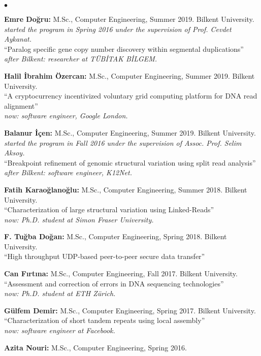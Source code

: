 \documentclass[margin,line]{res}
\newenvironment{list2}{
  \begin{list}{$\bullet$}{%
      \setlength{\itemsep}{0.1cm}
      \setlength{\parsep}{0in} \setlength{\parskip}{0in}
      \setlength{\topsep}{0in} \setlength{\partopsep}{0in} 
      \setlength{\leftmargin}{0.2in}}}{\end{list}}
\begin{document}
\begin{resume}
\begin{list2}
\item
  {\bf Emre Doğru:} M.Sc., Computer Engineering, Summer 2019.
  Bilkent University. {\it started the program in Spring 2016 under the supervision of Prof. Cevdet Aykanat.}\\
  ``Paralog specific gene copy number discovery within segmental duplications''\\
  {\it after Bilkent: researcher at TÜBİTAK BİLGEM.}
\item
  {\bf Halil İbrahim Özercan:} M.Sc., Computer Engineering, Summer 2019.
  Bilkent University. \\
  ``A cryptocurrency incentivized voluntary grid computing platform for DNA read alignment''\\
  {\it now: software engineer, Google London.}
\item
  {\bf Balanur İçen:} M.Sc., Computer Engineering, Summer 2019.
  Bilkent University. {\it started the program in Fall 2016 under the supervision of Assoc. Prof. Selim Aksoy.}\\
  ``Breakpoint refinement of genomic structural variation using split read analysis'' \\
  {\it after Bilkent: software engineer, K12Net.}
\item
  {\bf Fatih Karaoğlanoğlu:} M.Sc., Computer Engineering, Summer 2018.
  Bilkent University. \\
  ``Characterization of large structural variation using Linked-Reads''\\
  {\it now: Ph.D. student at Simon Fraser University.}
\item
  {\bf F. Tuğba Doğan:} M.Sc., Computer Engineering, Spring 2018.
  Bilkent University. \\
  ``High throughput UDP-based peer-to-peer secure data transfer''
\item
  {\bf Can Fırtına:} M.Sc., Computer Engineering,  Fall 2017.
  Bilkent University. \\
  ``Assessment and correction of errors in DNA sequencing technologies''\\
  {\it now: Ph.D. student at ETH Zürich.}
\item
  {\bf Gülfem Demir:} M.Sc., Computer Engineering, Spring 2017.
  Bilkent University. \\
  ``Characterization of short tandem repeats using local assembly''\\
  {\it now: software engineer at Facebook.}
\item
  {\bf Azita Nouri:} M.Sc., Computer Engineering, Spring 2016.

\end{list2}
\end{resume}
\end{document}
